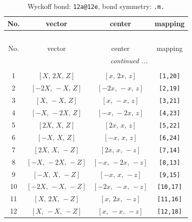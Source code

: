 \documentclass[fleqn,8pt]{jsarticle}
\begin{document}
\begin{longtable}{cccc}
\caption{Wyckoff bond: {\tt 12a@12e}, bond symmetry: {\tt .m.}}
 \\
 \hline \hline
No. & vector & center & mapping \\ \hline \endfirsthead

\multicolumn{3}{l}{\tablename\ \thetable{}} \\
 \hline \hline
No. & vector & center & mapping \\ \hline \endhead

 \hline \hline
\multicolumn{3}{r}{\footnotesize\it continued ...} \\ \endfoot

 \hline \hline
\multicolumn{3}{r}{} \\ \endlastfoot

1 & $\left[ X,\, 2 X,\, Z \right]$ & $\left[ x,\, 2 x,\, z \right]$ & {\tt [1,20]} \\ \hline
2 & $\left[ - 2 X,\, - X,\, Z \right]$ & $\left[ - 2 x,\, - x,\, z \right]$ & {\tt [2,19]} \\ \hline
3 & $\left[ X,\, - X,\, Z \right]$ & $\left[ x,\, - x,\, z \right]$ & {\tt [3,21]} \\ \hline
4 & $\left[ - X,\, - 2 X,\, Z \right]$ & $\left[ - x,\, - 2 x,\, z \right]$ & {\tt [4,23]} \\ \hline
5 & $\left[ 2 X,\, X,\, Z \right]$ & $\left[ 2 x,\, x,\, z \right]$ & {\tt [5,22]} \\ \hline
6 & $\left[ - X,\, X,\, Z \right]$ & $\left[ - x,\, x,\, z \right]$ & {\tt [6,24]} \\ \hline
7 & $\left[ 2 X,\, X,\, - Z \right]$ & $\left[ 2 x,\, x,\, - z \right]$ & {\tt [7,14]} \\ \hline
8 & $\left[ - X,\, - 2 X,\, - Z \right]$ & $\left[ - x,\, - 2 x,\, - z \right]$ & {\tt [8,13]} \\ \hline
9 & $\left[ - X,\, X,\, - Z \right]$ & $\left[ - x,\, x,\, - z \right]$ & {\tt [9,15]} \\ \hline
10 & $\left[ - 2 X,\, - X,\, - Z \right]$ & $\left[ - 2 x,\, - x,\, - z \right]$ & {\tt [10,17]} \\ \hline
11 & $\left[ X,\, 2 X,\, - Z \right]$ & $\left[ x,\, 2 x,\, - z \right]$ & {\tt [11,16]} \\ \hline
12 & $\left[ X,\, - X,\, - Z \right]$ & $\left[ x,\, - x,\, - z \right]$ & {\tt [12,18]} \\
\end{longtable}
\renewcommand{\arraystretch}{1.2}
\end{document}
